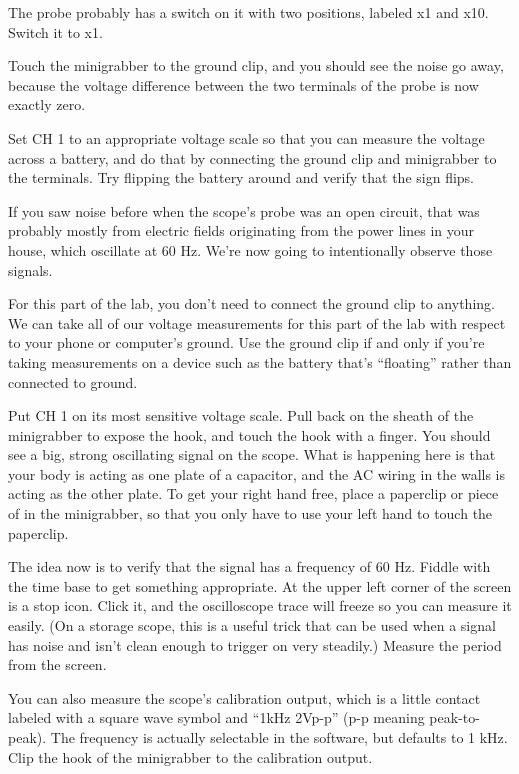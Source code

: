 The probe probably has a switch on it with two positions, labeled x1 and x10.
Switch it to x1.

Touch the minigrabber to the ground clip, and you should see the noise go
away, because the voltage difference between the two terminals of the probe is now exactly zero.

Set CH 1 to an appropriate voltage scale so that you can measure the voltage across
a battery, and do that by connecting the ground clip and minigrabber to the terminals. Try flipping the battery around and verify that the sign flips.


If you saw noise before when the scope's probe was an open circuit, that was probably
mostly from electric fields originating from the power lines in your house, which oscillate
at 60 Hz. We're now going to intentionally observe those signals.

For this part of the lab, you don't need to connect the ground clip to anything.
We can take all of our voltage measurements for this part of the lab
with respect to your phone or computer's ground. 
Use the ground clip if and only if you're taking measurements on a device such as the battery that's
``floating'' rather than connected to ground.

Put CH 1 on its most sensitive voltage scale. Pull back on the sheath of the minigrabber
to expose the hook, and touch the hook with a finger. You should see a big, strong
oscillating signal on the scope. What is happening here is that your body is acting
as one plate of a capacitor, and the AC wiring in the walls is acting as the other
plate.
To get your right hand free, place a  paperclip or piece of in the minigrabber, so that you
only have to use your left hand to touch the paperclip.

The idea now is to verify that the signal has a frequency of 60 Hz. Fiddle with the time
base to get something appropriate. At the upper left corner of the screen is a stop icon.
Click it, and the oscilloscope trace will freeze so you can measure it easily. (On a storage
scope, this is a useful trick that can be used when a signal has noise and isn't clean enough
to trigger on very steadily.) Measure the period from the screen.


You can also measure the scope's calibration output, which is a little
contact labeled with a square wave symbol and ``1kHz 2Vp-p'' (p-p
meaning peak-to-peak).  The frequency is actually selectable in the
software, but defaults to 1 kHz.  Clip the hook of the minigrabber to
the calibration output.


